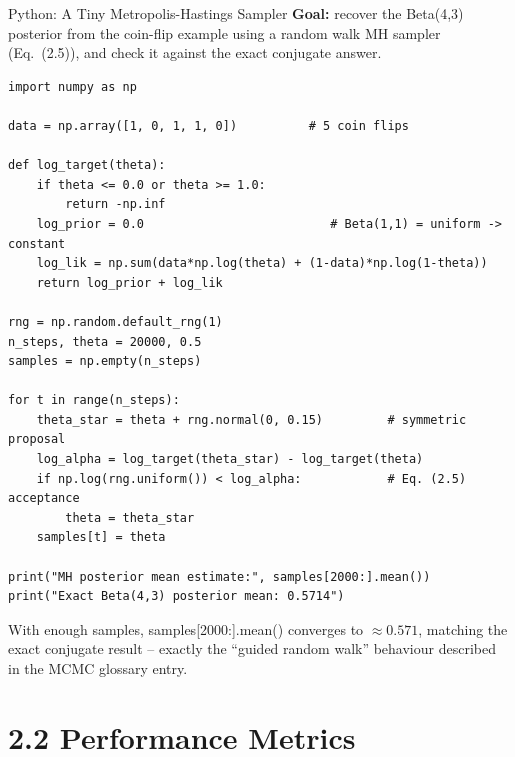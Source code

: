 \documentclass[aspectratio=169,10pt]{beamer}
\begin{document}
\begin{frame}[fragile]{Python: A Tiny Metropolis-Hastings Sampler}
  \textbf{Goal:} recover the Beta(4,3) posterior from the coin-flip example
  using a random walk MH sampler (Eq.~(2.5)), and check it against the exact
  conjugate answer.
  \begin{lstlisting}
import numpy as np

data = np.array([1, 0, 1, 1, 0])          # 5 coin flips

def log_target(theta):
    if theta <= 0.0 or theta >= 1.0:
        return -np.inf
    log_prior = 0.0                          # Beta(1,1) = uniform -> constant
    log_lik = np.sum(data*np.log(theta) + (1-data)*np.log(1-theta))
    return log_prior + log_lik

rng = np.random.default_rng(1)
n_steps, theta = 20000, 0.5
samples = np.empty(n_steps)

for t in range(n_steps):
    theta_star = theta + rng.normal(0, 0.15)         # symmetric proposal
    log_alpha = log_target(theta_star) - log_target(theta)
    if np.log(rng.uniform()) < log_alpha:            # Eq. (2.5) acceptance
        theta = theta_star
    samples[t] = theta

print("MH posterior mean estimate:", samples[2000:].mean())
print("Exact Beta(4,3) posterior mean: 0.5714")
  \end{lstlisting}
  With enough samples, {\ttfamily samples[2000:].mean()} converges to
  $\approx 0.571$, matching the exact conjugate result -- exactly the
  ``guided random walk'' behaviour described in the MCMC glossary entry.
\end{frame}

\section{2.2 Performance Metrics}
\end{document}
